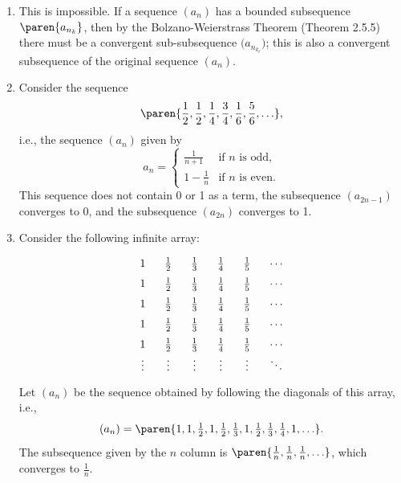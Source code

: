 \documentclass{lew98_solutions}
\begin{document}
\begin{solution}
    \begin{enumerate}
        \item This is impossible. If a sequence \( (a_n) \) has a bounded subsequence \( \paren{ a_{n_k} } \), then by the Bolzano-Weierstrass Theorem (Theorem 2.5.5) there must be a convergent sub-subsequence \( \big( a_{n_{k_{\ell}}} \big) \); this is also a convergent subsequence of the original sequence \( (a_n) \).

        \item Consider the sequence
        \[
            \paren{ \frac{1}{2}, \frac{1}{2}, \frac{1}{4}, \frac{3}{4}, \frac{1}{6}, \frac{5}{6}, \ldots },
        \]
        i.e., the sequence \( (a_n) \) given by
        \[
            a_n = \begin{cases}
                \frac{1}{n+1} & \text{if } n \text{ is odd}, \\
                1 - \frac{1}{n} & \text{if } n \text{ is even}.
            \end{cases}
        \]
        This sequence does not contain 0 or 1 as a term, the subsequence \( (a_{2n - 1}) \) converges to 0, and the subsequence \( (a_{2n}) \) converges to 1.

        \item Consider the following infinite array:
        \begin{gather*}
            \arraycolsep=3mm\def\arraystretch{1.5}
            \begin{matrix}
                1 & \tfrac{1}{2} & \tfrac{1}{3} & \tfrac{1}{4} & \tfrac{1}{5} & \cdots \\
                1 & \tfrac{1}{2} & \tfrac{1}{3} & \tfrac{1}{4} & \tfrac{1}{5} & \cdots \\
                1 & \tfrac{1}{2} & \tfrac{1}{3} & \tfrac{1}{4} & \tfrac{1}{5} & \cdots \\
                1 & \tfrac{1}{2} & \tfrac{1}{3} & \tfrac{1}{4} & \tfrac{1}{5} & \cdots \\
                1 & \tfrac{1}{2} & \tfrac{1}{3} & \tfrac{1}{4} & \tfrac{1}{5} & \cdots \\
                \vdots & \vdots & \vdots & \vdots & \vdots & \ddots
            \end{matrix}
        \end{gather*}
        Let \( (a_n) \) be the sequence obtained by following the diagonals of this array, i.e.,
        \[
            (a_n) = \paren{ 1, 1, \tfrac{1}{2}, 1, \tfrac{1}{2}, \tfrac{1}{3}, 1, \tfrac{1}{2}, \tfrac{1}{3}, \tfrac{1}{4}, 1, \ldots }.
        \]
        The subsequence given by the \( n \) column is \( \paren{ \tfrac{1}{n}, \tfrac{1}{n}, \tfrac{1}{n}, \ldots } \), which converges to \( \tfrac{1}{n} \).


\end{enumerate}
\end{solution}
\end{document}
